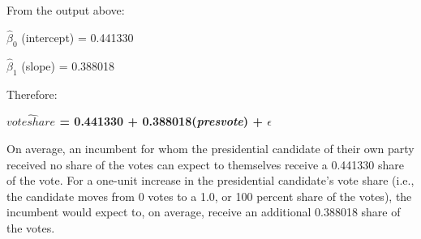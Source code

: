 \documentclass[12pt,letterpaper]{article}
\begin{document}
\begin{enumerate}
		From the output above:
		
		$\hat{\beta}_0$ (intercept) = 0.441330
		
		$\hat{\beta}_1$ (slope) = 0.388018
		
		\vspace{.5cm} Therefore:
		
		\textbf{		$\hat{voteshare}$ = 0.441330 + 0.388018(\textit{presvote}) + $\epsilon$}
		
					On average, an incumbent for whom the presidential candidate of their own party received no share of the votes can expect to themselves receive a 0.441330 share of the vote. For a one-unit increase in the presidential candidate's vote share (i.e., the candidate moves from 0 votes to a 1.0, or 100 percent share of the votes), the incumbent would expect to, on average, receive an additional 0.388018 share of the votes. 
		
	\end{enumerate}
	

\newpage	
\end{document}

